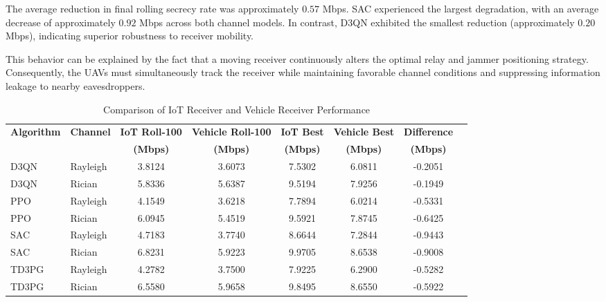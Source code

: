 \documentclass[journal,onecolumn]{IEEEtran}
\begin{document}
The average reduction in final rolling secrecy rate was approximately $0.57$ Mbps. SAC experienced the largest degradation, with an average decrease of approximately $0.92$ Mbps across both channel models. In contrast, D3QN exhibited the smallest reduction (approximately $0.20$ Mbps), indicating superior robustness to receiver mobility.

This behavior can be explained by the fact that a moving receiver continuously alters the optimal relay and jammer positioning strategy. Consequently, the UAVs must simultaneously track the receiver while maintaining favorable channel conditions and suppressing information leakage to nearby eavesdroppers.

\begin{table}[t]
\caption{Comparison of IoT Receiver and Vehicle Receiver Performance}
\label{tab:iot_vs_vehicle}
\centering
\renewcommand{\arraystretch}{1.15}
\begin{tabular}{llcccccc}
\toprule
\textbf{Algorithm} &
\textbf{Channel} &
\textbf{IoT Roll-100} &
\textbf{Vehicle Roll-100} &
\textbf{IoT Best} &
\textbf{Vehicle Best} &
\textbf{Difference} \\
&
&
\textbf{(Mbps)} &
\textbf{(Mbps)} &
\textbf{(Mbps)} &
\textbf{(Mbps)} &
\textbf{(Mbps)} \\
\midrule

D3QN  & Rayleigh & 3.8124 & 3.6073 & 7.5302 & 6.0811 & -0.2051 \\
D3QN  & Rician   & 5.8336 & 5.6387 & 9.5194 & 7.9256 & -0.1949 \\



PPO   & Rayleigh & 4.1549 & 3.6218 & 7.7894 & 6.0214 & -0.5331 \\
PPO   & Rician   & 6.0945 & 5.4519 & 9.5921 & 7.8745 & -0.6425 \\

SAC   & Rayleigh & 4.7183 & 3.7740 & 8.6644 & 7.2844 & -0.9443 \\
SAC   & Rician   & 6.8231 & 5.9223 & 9.9705 & 8.6538 & -0.9008 \\

TD3PG & Rayleigh & 4.2782 & 3.7500 & 7.9225 & 6.2900 & -0.5282 \\
TD3PG & Rician   & 6.5580 & 5.9658 & 9.8495 & 8.6550 & -0.5922 \\

\bottomrule
\end{tabular}
\end{table}
\end{document}

